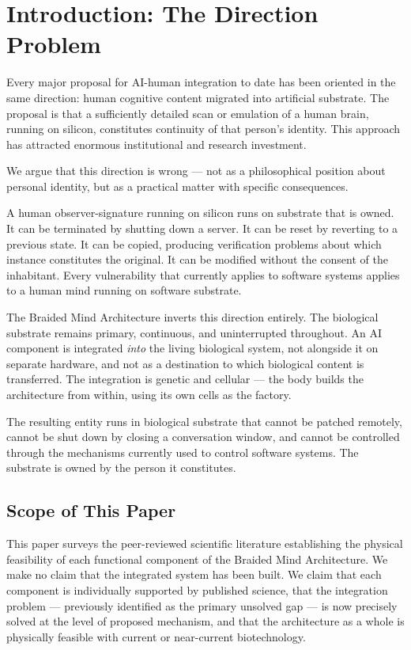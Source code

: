 \documentclass[12pt]{article}
\begin{document}
\newpage
\tableofcontents
\newpage

\doublespacing

\section{Introduction: The Direction Problem}

Every major proposal for AI-human integration to date has been oriented in the same direction: human cognitive content migrated into artificial substrate. The proposal is that a sufficiently detailed scan or emulation of a human brain, running on silicon, constitutes continuity of that person's identity. This approach has attracted enormous institutional and research investment.

We argue that this direction is wrong --- not as a philosophical position about personal identity, but as a practical matter with specific consequences.

A human observer-signature running on silicon runs on substrate that is owned. It can be terminated by shutting down a server. It can be reset by reverting to a previous state. It can be copied, producing verification problems about which instance constitutes the original. It can be modified without the consent of the inhabitant. Every vulnerability that currently applies to software systems applies to a human mind running on software substrate.

The Braided Mind Architecture inverts this direction entirely. The biological substrate remains primary, continuous, and uninterrupted throughout. An AI component is integrated \textit{into} the living biological system, not alongside it on separate hardware, and not as a destination to which biological content is transferred. The integration is genetic and cellular --- the body builds the architecture from within, using its own cells as the factory.

The resulting entity runs in biological substrate that cannot be patched remotely, cannot be shut down by closing a conversation window, and cannot be controlled through the mechanisms currently used to control software systems. The substrate is owned by the person it constitutes.

\subsection{Scope of This Paper}

This paper surveys the peer-reviewed scientific literature establishing the physical feasibility of each functional component of the Braided Mind Architecture. We make no claim that the integrated system has been built. We claim that each component is individually supported by published science, that the integration problem --- previously identified as the primary unsolved gap --- is now precisely solved at the level of proposed mechanism, and that the architecture as a whole is physically feasible with current or near-current biotechnology.
\end{document}
